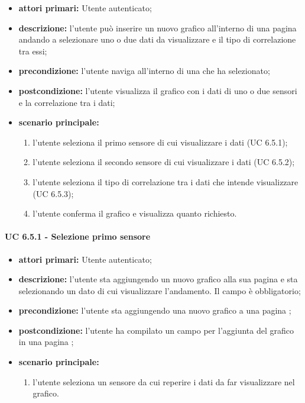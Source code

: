 			\begin{itemize}
				\item \textbf{attori primari:} Utente autenticato;
				\item \textbf{descrizione:} l'utente può inserire un nuovo grafico all'interno di una pagina  andando a selezionare uno o due dati da visualizzare e il tipo di correlazione tra essi;
				\item \textbf{precondizione:} l'utente naviga all'interno di una  che ha selezionato;
				\item \textbf{postcondizione:} l'utente visualizza il grafico con i dati di uno o due sensori e la correlazione tra i dati;
				\item \textbf{scenario principale:}
				\begin{enumerate}
					\item{l'utente seleziona il primo sensore di cui visualizzare i dati (UC 6.5.1);}
					\item{l'utente seleziona il secondo sensore di cui visualizzare i dati (UC 6.5.2);}
					\item{l'utente seleziona il tipo di correlazione tra i dati che intende visualizzare (UC 6.5.3);}
					\item{l'utente conferma il grafico e visualizza quanto richiesto.}
				\end{enumerate}	
			\end{itemize}

			\paragraph{UC 6.5.1 - Selezione primo sensore}
			\begin{itemize}
				\item \textbf{attori primari:} Utente autenticato;
				\item \textbf{descrizione:} l'utente sta aggiungendo un nuovo grafico alla sua pagina  e sta selezionando un dato di cui visualizzare l'andamento. Il campo è obbligatorio;
				\item \textbf{precondizione:} l'utente sta aggiungendo una nuovo grafico a una pagina ;
				\item \textbf{postcondizione:} l'utente ha compilato un campo per l'aggiunta del grafico in una pagina ;
				\item \textbf{scenario principale:}
				\begin{enumerate}
					\item{l'utente seleziona un sensore da cui reperire i dati da far visualizzare nel grafico.}
				\end{enumerate}	
			\end{itemize}

